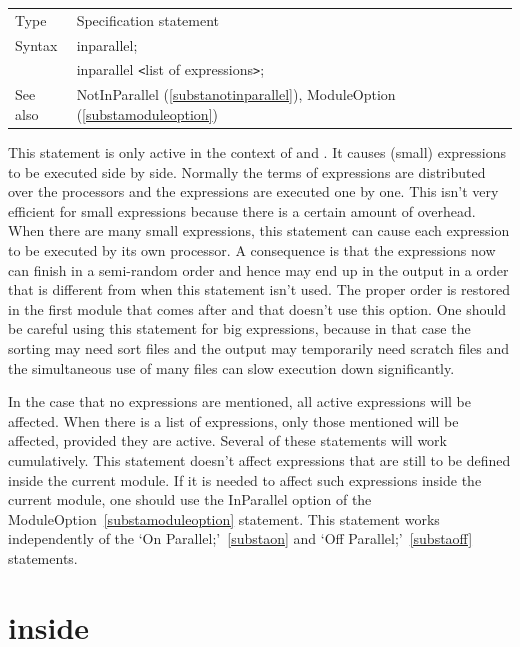 \noindent \begin{tabular}{ll}
Type & Specification statement\\
Syntax & inparallel; \\
       & inparallel {\tt<}list of expressions{\tt>};
\\ See also & NotInParallel (\ref{substanotinparallel}), 
     ModuleOption (\ref{substamoduleoption})
\end{tabular} \vspace{4mm}

\noindent This statement is only active in the context of 
\TFORM{} and \ParFORM{}. It causes 
(small) expressions to be executed side by side. Normally the terms of 
expressions are distributed over the processors and the expressions are 
executed one by one. This isn't very efficient for small expressions 
because there is a certain amount of overhead. When there are many small 
expressions, this statement can cause each expression to be executed by its 
own processor. A consequence is that the expressions now can finish in a 
semi-random order and hence may end up in the output in a order that is 
different from when this statement isn't used. The proper order is restored 
in the first module that comes after and that doesn't use this option. One 
should be careful using this statement for big expressions, because in that 
case the sorting may need sort files and the output may temporarily need 
scratch files and the simultaneous use of many files can slow execution 
down significantly.

\noindent In the case that no expressions are mentioned, all active 
expressions will be affected. When there is a list of expressions, only 
those mentioned will be affected, provided they are active. Several of 
these statements will work cumulatively. This statement doesn't affect 
expressions that are still to be defined inside the current module. If it 
is needed to affect such expressions inside the current module, one should 
use the InParallel option of the 
ModuleOption~\ref{substamoduleoption} 
statement. This statement works independently of the `On 
Parallel;'~\ref{substaon} and `Off Parallel;'~\ref{substaoff} statements.
\vspace{10mm}


\section{inside}
\label{substainside}

